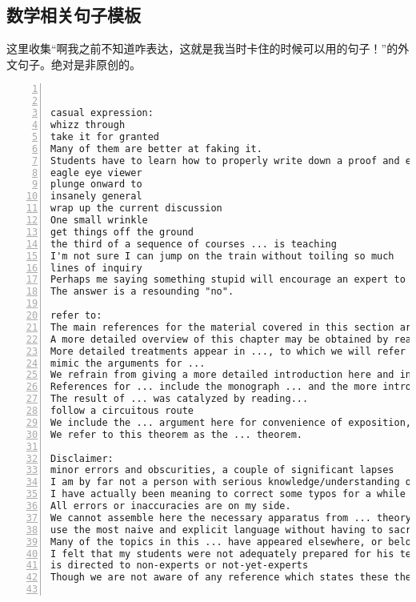 \documentclass[11pt]{amsart}
\begin{document}
\subsection{数学相关句子模板}
这里收集“啊我之前不知道咋表达，这就是我当时卡住的时候可以用的句子！”的外文句子。绝对是非原创的。
\begin{lstlisting}[numbers=left,numberstyle=\tiny,numbersep=10pt]


casual expression:
whizz through
take it for granted
Many of them are better at faking it.
Students have to learn how to properly write down a proof and everything. So one has to do important pedagogical work and teach them, how to do this.
eagle eye viewer
plunge onward to
insanely general
wrap up the current discussion
One small wrinkle
get things off the ground
the third of a sequence of courses ... is teaching
I'm not sure I can jump on the train without toiling so much
lines of inquiry
Perhaps me saying something stupid will encourage an expert to weigh in
The answer is a resounding "no".

refer to:
The main references for the material covered in this section are ...
A more detailed overview of this chapter may be obtained by reading the introductions to the various sections.
More detailed treatments appear in ..., to which we will refer for proofs.
mimic the arguments for ...
We refrain from giving a more detailed introduction here and instead refer the reader to the table of contents as well as to the short introductions of the individual sections.
References for ... include the monograph ... and the more introductory account ...
The result of ... was catalyzed by reading...
follow a circuitous route
We include the ... argument here for convenience of exposition, and because the comparison with their constructions is interesting in its own right.
We refer to this theorem as the ... theorem.

Disclaimer:
minor errors and obscurities, a couple of significant lapses
I am by far not a person with serious knowledge/understanding of ..., thus in the ... I may oversimplify/overcomplicate things, be inaccurate, or even wrong, and miss subtelties.
I have actually been meaning to correct some typos for a while and so I will hopefully do all these corrections in the next few weeks.
All errors or inaccuracies are on my side.
We cannot assemble here the necessary apparatus from ... theory.
use the most naive and explicit language without having to sacrifice any essential ideas
Many of the topics in this ... have appeared elsewhere, or belong to the mathematical folklore; it should not be assumed that uncredited results are due to the author.
I felt that my students were not adequately prepared for his text, and I wrote my notes with the hope to provide this preparation.
is directed to non-experts or not-yet-experts
Though we are not aware of any reference which states these theorems in the generality which we consider, these theorems should be considered well known.


\end{lstlisting}
\end{document}
